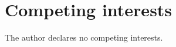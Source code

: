 \documentclass[preprint,12pt,nonatbib]{elsarticle}
\begin{document}
\section{Competing interests}
The author declares no competing interests.


\clearpage
\printbibliography


\end{document}

